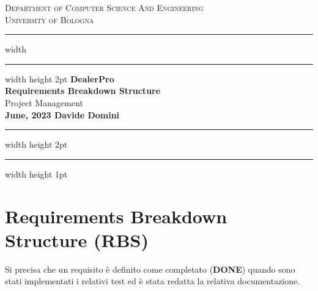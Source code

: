 \documentclass{article}
\begin{document}
\begin{titlepage}

  \newcommand{\HRule}{\rule{\linewidth}{0.5mm}}
  \center
  
  \textsc{\Large Department of Computer Science And Engineering}\\[0.5cm]
  
  \textsc{\Large University of Bologna}\\[0.6cm]
  
  \hrule width \hsize \kern 1mm \hrule width \hsize height 2pt 
  \vspace{0.8cm}
  { \large \bfseries DealerPro}\\[0.6cm]
  { \large \bfseries Requirements Breakdown Structure}\\[0.6cm]
  { \large Project Management}\\[0.6cm]
  
  
  {\bfseries{June, 2023}
  \hfill
  \bfseries{Davide Domini}}\\[0.6cm]
  
  \hrule width \hsize height 2pt \kern 1mm \hrule width \hsize height 1pt
  \vspace{0.4cm}
  
  \end{titlepage}

  \clearpage
  
  \section{Requirements Breakdown Structure (RBS)}

  Si precisa che un requisito è definito come completato (\textbf{DONE}) quando sono stati implementati i relativi test 
  ed è stata redatta la relativa documentazione.
\end{document}
